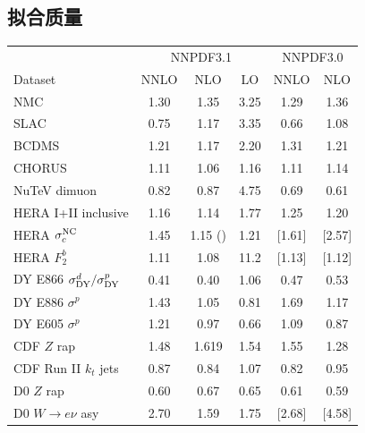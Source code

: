\subsection{拟合质量}
\label{sec:fquality}

\begin{table}[h]
\begin{center}
  \scriptsize
      \renewcommand{\arraystretch}{1.10}
\begin{tabular}{|l|c|c|c||c|c|}
\hline
  & \multicolumn{3}{c||}{NNPDF3.1  } & \multicolumn{2}{c|}{NNPDF3.0 } 
\\Dataset  &  NNLO  & NLO & LO  & NNLO  & NLO  \\
\hline
\hline
NMC    &    1.30     &   1.35   &     3.25       &   1.29   &   1.36  \\    
SLAC    &    0.75      &   1.17   &   3.35       &   0.66   &   1.08  \\    
BCDMS    &    1.21      &   1.17   &  2.20        &   1.31   &   1.21  \\    
CHORUS    &    1.11      &   1.06   &   1.16      &   1.11   &   1.14  \\    
NuTeV dimuon    &    0.82      &   0.87   &  4.75         &   0.69  &   0.61  \\    
\hline
HERA I+II inclusive    &    1.16      &   1.14   &  1.77         &   1.25   &   1.20  \\      
HERA $\sigma_c^{\rm NC}$    &    1.45      &   1.15 ()   &  1.21           &  [1.61]   &   [2.57]  \\    
HERA $F_2^b$    &    1.11      &   1.08   &   11.2           &   [1.13]   &   [1.12]  \\    
\hline
\hline
DY E866 $\sigma^d_{\rm DY}/\sigma^p_{\rm DY}$ &    0.41     &   0.40   &     1.06       &   0.47   &   0.53  \\    
DY E886 $\sigma^p$    &    1.43     &   1.05   &    0.81       &   1.69   &   1.17  \\    
DY E605  $\sigma^p$   &    1.21     &   0.97   &  0.66      &   1.09   &   0.87  \\    
\hline
CDF $Z$ rap    &    1.48     &   1.619   &    1.54         &   1.55   &   1.28  \\    
CDF Run II $k_t$ jets    &    0.87      &   0.84   &  1.07           &   0.82   &   0.95  \\    
\hline
D0 $Z$ rap    &    0.60      &   0.67   &    0.65         &   0.61   &   0.59  \\    
D0 $W\to e\nu$  asy   &    2.70      &   1.59   &   1.75         &   [2.68]   &   [4.58]  \\    

\end{tabular}
\end{center}
\end{table}
